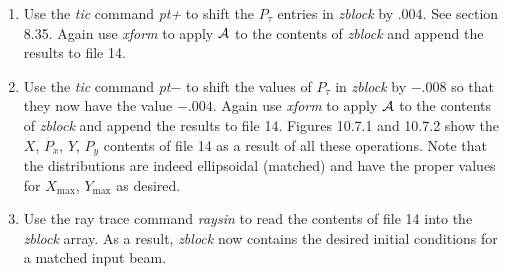\begin{enumerate}
\item Use the {\em tic} command {\em pt+} to shift the $P_{\tau}$ entries in
{\em zblock} by .004.  See section 8.35.  Again use {\em xform} to apply
${\cal A}$ to the contents of {\em zblock} and append the results to file 14.

\item Use the {\em tic} command {\em pt$-$} to shift the values of
$P_{\tau}$ in {\em zblock} by $-.008$ so that they now have the value $-.004$.
Again use {\em xform} to apply ${\cal A}$ to the contents of {\em zblock} and
append the results to file 14.  Figures 10.7.1 and 10.7.2 show the $X$,
$P_x$, $Y$, $P_y$ contents of file 14 as a result of all these
operations.  Note that the distributions are indeed ellipsoidal (matched)
and have the proper values for $X_{\max}$, $Y_{\max}$ as desired.

\item Use the ray trace command {\em raysin} to read the contents of file
14 into the {\em zblock} array.  As a result, {\em zblock} now contains the desired
initial conditions for a matched input beam.
\end{enumerate}

